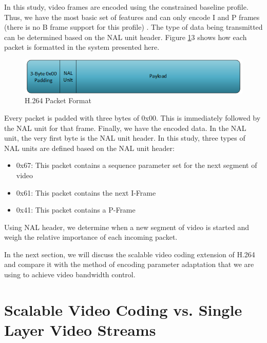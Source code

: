 \documentclass[a4paper,12pt]{article}
\begin{document}
In this study, video frames are encoded using the constrained baseline profile. Thus, we have the most basic set of features and can only encode I and P frames (there is no B frame support for this profile) \cite{H264Spec}. The type of data being transmitted can be determined based on the NAL unit header. Figure \ref{fig:H264PacketFormat}3 shows how each packet is formatted in the system presented here.
\begin{figure}[h]
\centering
\includegraphics[width=0.8\linewidth]{H264HeaderFormat.png}
\caption{H.264 Packet Format}
\label{fig:H264PacketFormat}
\end{figure}
Every packet is padded with three bytes of 0x00. This is immediately followed by the NAL unit for that frame. Finally, we have the encoded data. In the NAL unit, the very first byte is the NAL unit header. In this study, three types of NAL units are defined based on the NAL unit header:
\begin{itemize}
\item 0x67: This packet contains a sequence parameter set for the next segment of video
\item 0x61: This packet contains the next I-Frame
\item 0x41: This packet contains a P-Frame
\end{itemize}
Using NAL header, we determine when a new segment of video is started and weigh the relative importance of each incoming packet. 

In the next section, we will discuss the scalable video coding extension of H.264 and compare it with the method of encoding parameter adaptation that we are using to achieve video bandwidth control.


\section{Scalable Video Coding vs. Single Layer Video Streams}
\label{sec:SVC}
\end{document}
